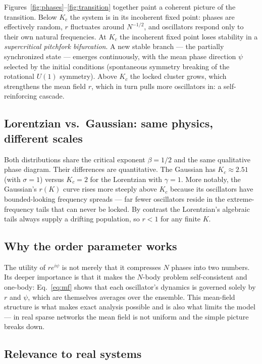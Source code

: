 \documentclass[12pt,a4paper]{article}
\begin{document}
Figures~\ref{fig:phases}--\ref{fig:transition} together paint a coherent
picture of the transition.
Below $K_c$ the system is in its incoherent fixed point: phases are
effectively random, $r$ fluctuates around $N^{-1/2}$, and oscillators
respond only to their own natural frequencies.
At $K_c$ the incoherent fixed point loses stability in a
\emph{supercritical pitchfork bifurcation}.
A new stable branch — the partially synchronized state — emerges
continuously, with the mean phase direction $\psi$ selected by
the initial conditions (spontaneous symmetry breaking of the
rotational $U(1)$ symmetry).
Above $K_c$ the locked cluster grows, which strengthens the mean field
$r$, which in turn pulls more oscillators in: a self-reinforcing cascade.

\subsection{Lorentzian vs.\ Gaussian: same physics, different scales}

Both distributions share the critical exponent $\beta = 1/2$ and the
same qualitative phase diagram.
Their differences are quantitative.
The Gaussian has $K_c \approx 2.51$ (with $\sigma=1$) versus $K_c = 2$
for the Lorentzian with $\gamma=1$.
More notably, the Gaussian's $r(K)$ curve rises more steeply above $K_c$
because its oscillators have bounded-looking frequency spreads —
far fewer oscillators reside in the extreme-frequency tails that can
never be locked.
By contrast the Lorentzian's algebraic tails always supply a drifting
population, so $r < 1$ for any finite $K$.

\subsection{Why the order parameter works}

The utility of $r e^{i\psi}$ is not merely that it compresses $N$
phases into two numbers.
Its deeper importance is that it makes the $N$-body problem self-consistent
and one-body: Eq.~\eqref{eq:mf} shows that each oscillator's dynamics
is governed solely by $r$ and $\psi$, which are themselves averages over
the ensemble.
This mean-field structure is what makes exact analysis possible and
is also what limits the model — in real sparse networks the mean field
is not uniform and the simple picture breaks down.

\subsection{Relevance to real systems}
\end{document}
